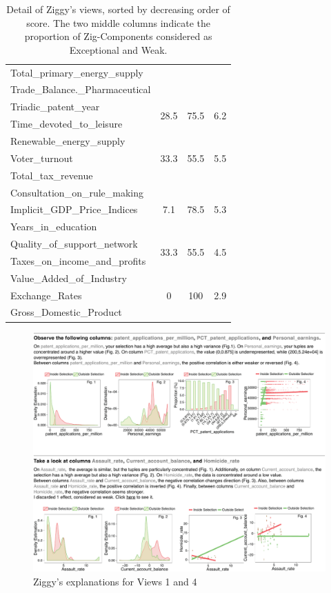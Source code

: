 \begin{table}[!ht]
\begin{tabular}{p{4cm} c c c}
        Total\_primary\_energy\_supply&&&\\ 
        Trade\_Balance.\_Pharmaceutical&&&\\ 
        \hline
        Triadic\_patent\_year&
        \multirow{2}{*}{28.5} &\multirow{2}{*}{75.5} & \multirow{2}{*}{6.2} \\
        Time\_devoted\_to\_leisure&&&\\ 
        \hline
        Renewable\_energy\_supply&
        \multirow{3}{*}{33.3} &\multirow{3}{*}{55.5} & \multirow{3}{*}{5.5} \\
        Voter\_turnout&&&\\ 
        Total\_tax\_revenue&&&\\ 
        \hline
        Consultation\_on\_rule\_making&
        \multirow{3}{*}{7.1} &\multirow{3}{*}{78.5} & \multirow{3}{*}{5.3} \\
        Implicit\_GDP\_Price\_Indices&&&\\
        Years\_in\_education&&&\\
        \hline
        Quality\_of\_support\_network&
        \multirow{2}{*}{33.3} &\multirow{2}{*}{55.5} & \multirow{2}{*}{4.5} \\
        Taxes\_on\_income\_and\_profits&&&\\
        \hline
        Value\_Added\_of\_Industry&
        \multirow{3}{*}{0} &\multirow{3}{*}{100} & \multirow{3}{*}{2.9} \\
        Exchange\_Rates&&&\\
        Gross\_Domestic\_Product&&&\\
        \hline
    \end{tabular}
    \caption{Detail of Ziggy's views, sorted by decreasing order of score. The
    two middle columns indicate the proportion of Zig-Components considered as
Exceptional and Weak.}
    \label{tab:ziggysviews}
\end{table}
\begin{figure}[!ht]
  \centering
  \includegraphics[width=2\columnwidth]{Figures/UseCase}
  \caption{Ziggy's explanations for Views 1 and 4}
  \label{pic:zigdetail}
\end{figure}
